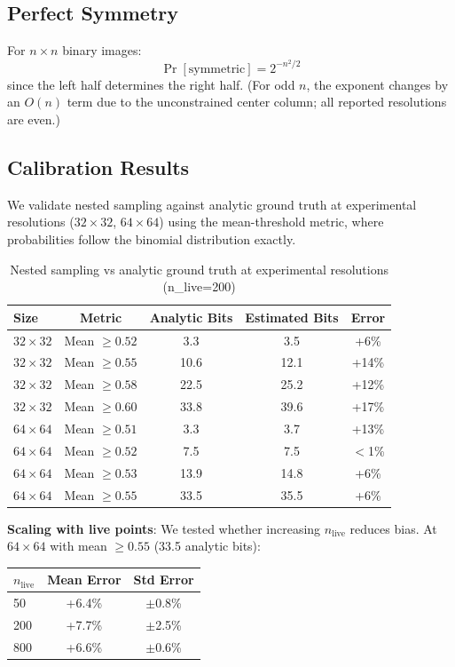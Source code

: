 \subsection{Perfect Symmetry}

For $n \times n$ binary images:
\begin{equation}
\Pr[\text{symmetric}] = 2^{-n^2/2}
\end{equation}
since the left half determines the right half. (For odd $n$, the exponent changes by an $O(n)$ term due to the unconstrained center column; all reported resolutions are even.)

\subsection{Calibration Results}

We validate nested sampling against analytic ground truth at experimental resolutions ($32 \times 32$, $64 \times 64$) using the mean-threshold metric, where probabilities follow the binomial distribution exactly.

\begin{table}[H]
\centering
\caption{Nested sampling vs analytic ground truth at experimental resolutions (n\_live=200)}
\begin{tabular}{lcccc}
\toprule
Size & Metric & Analytic Bits & Estimated Bits & Error \\
\midrule
$32 \times 32$ & Mean $\geq 0.52$ & 3.3 & 3.5 & +6\% \\
$32 \times 32$ & Mean $\geq 0.55$ & 10.6 & 12.1 & +14\% \\
$32 \times 32$ & Mean $\geq 0.58$ & 22.5 & 25.2 & +12\% \\
$32 \times 32$ & Mean $\geq 0.60$ & 33.8 & 39.6 & +17\% \\
$64 \times 64$ & Mean $\geq 0.51$ & 3.3 & 3.7 & +13\% \\
$64 \times 64$ & Mean $\geq 0.52$ & 7.5 & 7.5 & $<$1\% \\
$64 \times 64$ & Mean $\geq 0.53$ & 13.9 & 14.8 & +6\% \\
$64 \times 64$ & Mean $\geq 0.55$ & 33.5 & 35.5 & +6\% \\
\bottomrule
\end{tabular}
\end{table}

\textbf{Scaling with live points}: We tested whether increasing $n_{\text{live}}$ reduces bias. At $64 \times 64$ with mean $\geq 0.55$ (33.5 analytic bits):

\begin{center}
\begin{tabular}{lcc}
\toprule
$n_{\text{live}}$ & Mean Error & Std Error \\
\midrule
50 & +6.4\% & $\pm$0.8\% \\
200 & +7.7\% & $\pm$2.5\% \\
800 & +6.6\% & $\pm$0.6\% \\
\bottomrule
\end{tabular}
\end{center}

